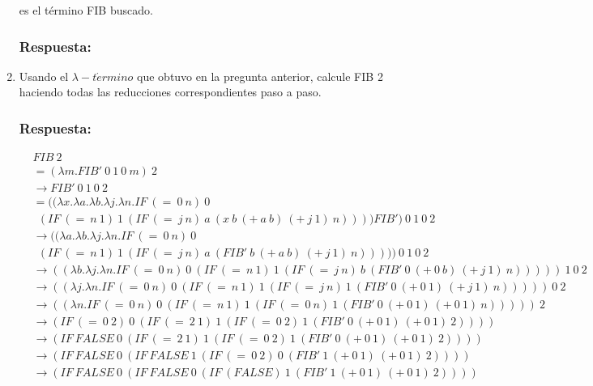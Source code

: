 \documentclass{article}
\begin{document}
\begin{enumerate}
es el término FIB buscado.

\subsubsection*{Respuesta:}


\item Usando el $\lambda-t \acute ermino$ que obtuvo en la pregunta anterior, calcule FIB 2 haciendo todas las reducciones correspondientes paso a paso.

\subsubsection*{Respuesta:}

\begin{align*}
&FIB\ 2
\\&=(\lambda m . FIB'\ 0\ 1\ 0\ m)\ 2
\\&\rightarrow FIB'\ 0\ 1\ 0\ 2
\\&= ((\lambda x . \lambda a . \lambda b . \lambda j . \lambda n .IF\ (=\ 0\ n)\ 0\ \\&\ \ (IF\ (=\ n\ 1)\ 1\ (IF\ (=\ j\ n)\ a\ (x\ b\ (+\ a\ b)\ (+\ j\ 1)\ n)))) FIB')\ 0\ 1\ 0\ 2
\\&\rightarrow ((\lambda a . \lambda b . \lambda j . \lambda n .IF\ (=\ 0\ n)\ 0\ \\&\ \ (IF\ (=\ n\ 1)\ 1\ (IF\ (=\ j\ n)\ a\ (FIB'\ b\ (+\ a\ b)\ (+\ j\ 1)\ n)))))\ 0\ 1\ 0\ 2
\\&\rightarrow ((\lambda b . \lambda j . \lambda n .IF\ (=\ 0\ n)\ 0\ (IF\ (=\ n\ 1)\ 1\ (IF\ (=\ j\ n)\ b\ (FIB'\ 0\ (+\ 0\ b)\ (+\ j\ 1)\ n)))))\ 1\ 0\ 2
\\&\rightarrow ((\lambda j . \lambda n .IF\ (=\ 0\ n)\ 0\ (IF\ (=\ n\ 1)\ 1\ (IF\ (=\ j\ n)\ 1\ (FIB'\ 0\ (+\ 0\ 1)\ (+\ j\ 1)\ n)))))\ 0\ 2
\\&\rightarrow ((\lambda n .IF\ (=\ 0\ n)\ 0\ (IF\ (=\ n\ 1)\ 1\ (IF\ (=\ 0\ n)\ 1\ (FIB'\ 0\ (+\ 0\ 1)\ (+\ 0\ 1)\ n)))))\ 2
\\&\rightarrow (IF\ (=\ 0\ 2)\ 0\ (IF\ (=\ 2\ 1)\ 1\ (IF\ (=\ 0\ 2)\ 1\ (FIB'\ 0\ (+\ 0\ 1)\ (+\ 0\ 1)\ 2))))
\\&\rightarrow (IF\ FALSE\ 0\ (IF\ (=\ 2\ 1)\ 1\ (IF\ (=\ 0\ 2)\ 1\ (FIB'\ 0\ (+\ 0\ 1)\ (+\ 0\ 1)\ 2))))
\\&\rightarrow (IF\ FALSE\ 0\ (IF\ FALSE\ 1\ (IF\ (=\ 0\ 2)\ 0\ (FIB'\ 1\ (+\ 0\ 1)\ (+\ 0\ 1)\ 2))))
\\&\rightarrow (IF\ FALSE\ 0\ (IF\ FALSE\ 0\ (IF\ (FALSE)\ 1\ (FIB'\ 1\ (+\ 0\ 1)\ (+\ 0\ 1)\ 2))))

\end{align*}
\end{enumerate}
\end{document}
